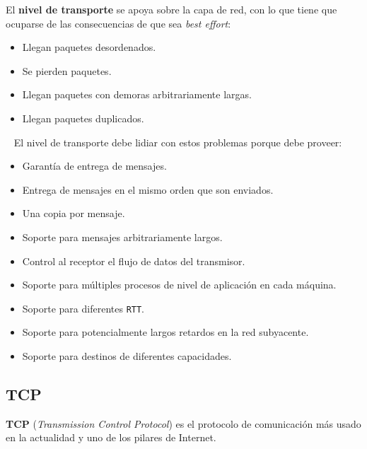 \documentclass[]{article}
\begin{document}
El \textbf{nivel de transporte} se apoya sobre la capa de red, con lo que tiene que ocuparse de las consecuencias de que sea \emph{best effort}:
\begin{itemize}
    \item Llegan paquetes desordenados.
    \item Se pierden paquetes.
    \item Llegan paquetes con demoras arbitrariamente largas.
    \item Llegan paquetes duplicados.
\end{itemize}

~\newline
El nivel de transporte debe lidiar con estos problemas porque debe proveer:
\begin{itemize}
    \item Garantía de entrega de mensajes.
    \item Entrega de mensajes en el mismo orden que son enviados.
    \item Una copia por mensaje.
    \item Soporte para mensajes arbitrariamente largos.
    \item Control al receptor el flujo de datos del transmisor.
    \item Soporte para múltiples procesos de nivel de aplicación en cada máquina.
    \item Soporte para diferentes \texttt{RTT}.
    \item Soporte para potencialmente largos retardos en la red subyacente.
    \item Soporte para destinos de diferentes capacidades.
\end{itemize}

\subsection{TCP}
\textbf{TCP} (\emph{Transmission Control Protocol}) es el protocolo de comunicación más usado en la actualidad y uno de los pilares de Internet.
\end{document}
